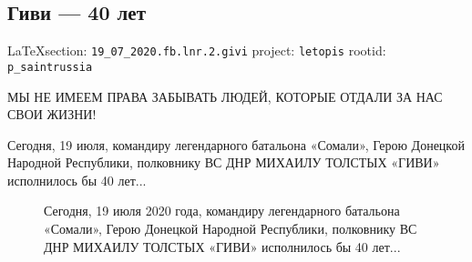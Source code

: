  
 
\subsection{Гиви --- 40 лет}
  
\vspace{0.5cm}
{\small\LaTeX section: \verb|19_07_2020.fb.lnr.2.givi| project: \verb|letopis| rootid: \verb|p_saintrussia|}
\vspace{0.5cm}

МЫ НЕ ИМЕЕМ ПРАВА ЗАБЫВАТЬ ЛЮДЕЙ, КОТОРЫЕ ОТДАЛИ ЗА НАС СВОИ ЖИЗНИ!

Сегодня, 19 июля, командиру легендарного батальона «Сомали», Герою Донецкой
Народной Республики, полковнику ВС ДНР МИХАИЛУ ТОЛСТЫХ «ГИВИ» исполнилось бы 40
лет...
  
\begin{figure}[ht]
 \centering
 \caption{Сегодня, 19 июля 2020 года, командиру легендарного батальона «Сомали», Герою
				Донецкой Народной Республики, полковнику ВС ДНР МИХАИЛУ ТОЛСТЫХ «ГИВИ»
				исполнилось бы 40 лет...}
 \label{fig:}
\end{figure}

